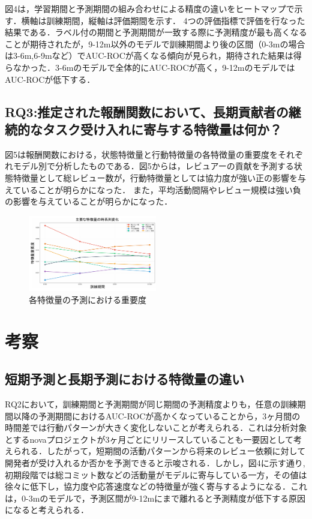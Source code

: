\documentclass[submit,techrep,noauthor]{ipsj}
\begin{document}
図4は，学習期間と予測期間の組み合わせによる精度の違いをヒートマップで示す．横軸は訓練期間，縦軸は評価期間を示す．
4つの評価指標で評価を行なった結果である．ラベル付の期間と予測期間が一致する際に予測精度が最も高くなることが期待されたが，9-12m以外のモデルで訓練期間より後の区間（0-3mの場合は3-6m,6-9mなど）でAUC-ROCが高くなる傾向が見られ，期待された結果は得らなかった．3-6mのモデルで全体的にAUC-ROCが高く，9-12mのモデルではAUC-ROCが低下する．

\subsection{RQ3:推定された報酬関数において、長期貢献者の継続的なタスク受け入れに寄与する特徴量は何か？}
図5は報酬関数における，状態特徴量と行動特徴量の各特徴量の重要度をそれぞれモデル別で分析したものである．図5からは，レビュアーの貢献を予測する状態特徴量として総レビュー数が，行動特徴量としては協力度が強い正の影響を与えていることが明らかになった．
また，平均活動間隔やレビュー規模は強い負の影響を与えていることが明らかになった．


\begin{figure}[h]
    \centering
\includegraphics[width=0.5\textwidth]{./Hashimoto_fig/importance.pdf}
    \caption{各特徴量の予測における重要度}
    \label{fig:importance}
\end{figure}



\section{考察}
\label{sec:discussion}
\subsection{短期予測と長期予測における特徴量の違い}
RQ2において，訓練期間と予測期間が同じ期間の予測精度よりも，任意の訓練期間以降の予測期間におけるAUC-ROCが高かくなっていることから，3ヶ月間の時間差では行動パターンが大きく変化しないことが考えられる．これは分析対象とするnovaプロジェクトが3ヶ月ごとにリリースしていることも一要因として考えられる．したがって，短期間の活動パターンから将来のレビュー依頼に対して開発者が受け入れるか否かを予測できると示唆される．しかし，図4に示す通り,初期段階では総コミット数などの活動量がモデルに寄与している一方，その値は徐々に低下し，協力度や応答速度などの特徴量が強く寄与するようになる．これは，0-3mのモデルで，予測区間が9-12mにまで離れると予測精度が低下する原因になると考えられる．
\end{document}
